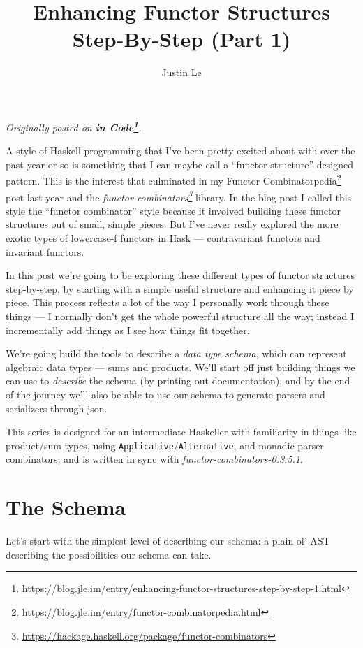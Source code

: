 \documentclass[]{article}
\title{Enhancing Functor Structures Step-By-Step (Part 1)}
\author{Justin Le}
\renewcommand{\href}[2]{#2\footnote{\url{#1}}}
\begin{document}
\maketitle

\emph{Originally posted on
\textbf{\href{https://blog.jle.im/entry/enhancing-functor-structures-step-by-step-1.html}{in
Code}}.}

A style of Haskell programming that I've been pretty excited about with over the
past year or so is something that I can maybe call a ``functor structure''
designed pattern. This is the interest that culminated in my
\href{https://blog.jle.im/entry/functor-combinatorpedia.html}{Functor
Combinatorpedia} post last year and the
\emph{\href{https://hackage.haskell.org/package/functor-combinators}{functor-combinators}}
library. In the blog post I called this style the ``functor combinator'' style
because it involved building these functor structures out of small, simple
pieces. But I've never really explored the more exotic types of lowercase-f
functors in Hask --- contravariant functors and invariant functors.

In this post we're going to be exploring these different types of functor
structures step-by-step, by starting with a simple useful structure and
enhancing it piece by piece. This process reflects a lot of the way I personally
work through these things --- I normally don't get the whole powerful structure
all the way; instead I incrementally add things as I see how things fit
together.

We're going build the tools to describe a \emph{data type schema}, which can
represent algebraic data types --- sums and products. We'll start off just
building things we can use to \emph{describe} the schema (by printing out
documentation), and by the end of the journey we'll also be able to use our
schema to generate parsers and serializers through json.

This series is designed for an intermediate Haskeller with familiarity in things
like product/sum types, using \texttt{Applicative}/\texttt{Alternative}, and
monadic parser combinators, and is written in sync with
\emph{functor-combinators-0.3.5.1}.

\hypertarget{the-schema}{%
\section{The Schema}\label{the-schema}}

Let's start with the simplest level of describing our schema: a plain ol' AST
describing the possibilities our schema can take.
\end{document}
